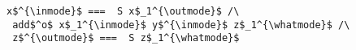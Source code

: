 \begin{figure}[!t]
  \centering
  \begin{minipage}{0.57\columnwidth}
    \begin{lstlisting}[frame=tb]
 x$^{\inmode}$ ===  S x$_1^{\outmode}$ /\
 add$^o$ x$_1^{\inmode}$ y$^{\inmode}$ z$_1^{\whatmode}$ /\
 z$^{\outmode}$ ===  S z$_1^{\whatmode}$
    \end{lstlisting}
  \end{minipage}
\end{figure}